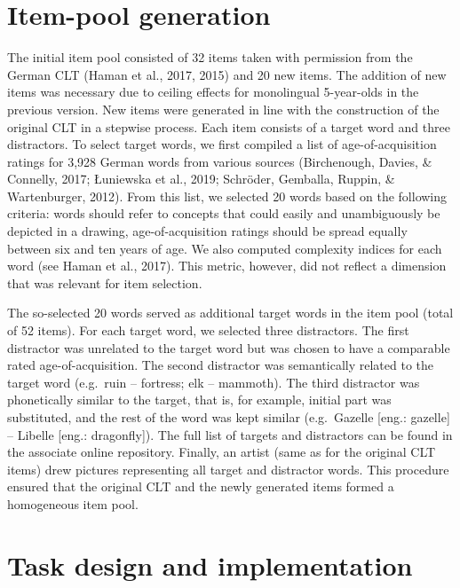 \documentclass[
  man,floatsintext]{apa6}
\begin{document}
\hypertarget{item-pool-generation}{%
\section{Item-pool generation}\label{item-pool-generation}}

The initial item pool consisted of 32 items taken with permission from the German CLT (Haman et al., 2017, 2015) and 20 new items. The addition of new items was necessary due to ceiling effects for monolingual 5-year-olds in the previous version. New items were generated in line with the construction of the original CLT in a stepwise process. Each item consists of a target word and three distractors. To select target words, we first compiled a list of age-of-acquisition ratings for 3,928 German words from various sources (Birchenough, Davies, \& Connelly, 2017; Łuniewska et al., 2019; Schröder, Gemballa, Ruppin, \& Wartenburger, 2012). From this list, we selected 20 words based on the following criteria: words should refer to concepts that could easily and unambiguously be depicted in a drawing, age-of-acquisition ratings should be spread equally between six and ten years of age. We also computed complexity indices for each word (see Haman et al., 2017). This metric, however, did not reflect a dimension that was relevant for item selection.

The so-selected 20 words served as additional target words in the item pool (total of 52 items). For each target word, we selected three distractors. The first distractor was unrelated to the target word but was chosen to have a comparable rated age-of-acquisition. The second distractor was semantically related to the target word (e.g.~ruin -- fortress; elk -- mammoth). The third distractor was phonetically similar to the target, that is, for example, initial part was substituted, and the rest of the word was kept similar (e.g.~Gazelle {[}eng.: gazelle{]} -- Libelle {[}eng.: dragonfly{]}). The full list of targets and distractors can be found in the associate online repository. Finally, an artist (same as for the original CLT items) drew pictures representing all target and distractor words. This procedure ensured that the original CLT and the newly generated items formed a homogeneous item pool.

\hypertarget{task-design-and-implementation}{%
\section{Task design and implementation}\label{task-design-and-implementation}}
\end{document}
